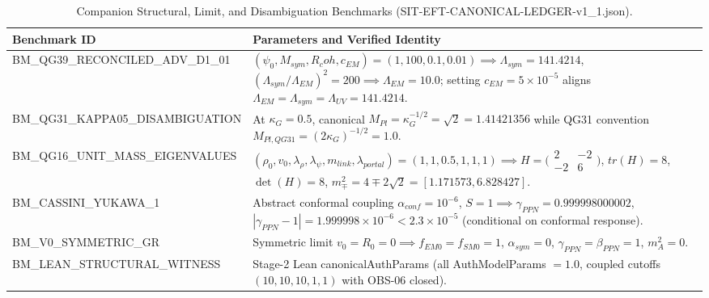 \documentclass[american,11pt,letterpaper]{article}
\newcommand{\Rcoh}{R_{\mathrm{coh}}}
\def\mathrm#1{#1}%
\def\texttt#1{#1}%
\def\Rcoh{R_coh}%
\begin{document}
\begin{table}[htbp]
\centering
\caption{Companion Structural, Limit, and Disambiguation Benchmarks (\texttt{SIT-EFT-CANONICAL-LEDGER-v1\_\allowbreak{}1.\allowbreak{}json}).}
\label{tab:six-companion-benchmarks}
\vspace{0.4em}
\small
\begin{tabular}{|p{4.6cm}|p{9.8cm}|}
\hline
\textbf{Benchmark ID} & \textbf{Parameters and Verified Identity} \\
\hline
\texttt{BM\_\allowbreak{}QG39\_\allowbreak{}RECONCILED\_\allowbreak{}ADV\_\allowbreak{}D1\_\allowbreak{}01} & $(\psi_0, M_{\mathrm{sym}}, \Rcoh, c_{\mathrm{EM}}) = (1, 100, 0.1, 0.01) \implies \Lambda_{\mathrm{sym}} = 141.4214$, $(\Lambda_{\mathrm{sym}}/\Lambda_{\mathrm{EM}})^2 = 200 \implies \Lambda_{\mathrm{EM}} = 10.0$; setting $c_{\mathrm{EM}} = 5\times 10^{-5}$ aligns $\Lambda_{\mathrm{EM}} = \Lambda_{\mathrm{sym}} = \Lambda_{\mathrm{UV}} = 141.4214$. \\
\hline
\texttt{BM\_\allowbreak{}QG31\_\allowbreak{}KAPPA05\_\allowbreak{}DISAMBIGUATION} & At $\kappa_G = 0.5$, canonical $M_{\mathrm{Pl}} = \kappa_G^{-1/2} = \sqrt{2} = 1.41421356$ while \texttt{QG31} convention $M_{\mathrm{Pl,QG31}} = (2\kappa_G)^{-1/2} = 1.0$. \\
\hline
\texttt{BM\_\allowbreak{}QG16\_\allowbreak{}UNIT\_\allowbreak{}MASS\_\allowbreak{}EIGENVALUES} & $(\rho_0,v_0,\lambda_\rho,\lambda_\psi,m_{\mathrm{link}},\lambda_{\mathrm{portal}}) = (1,1,0.5,1,1,1) \implies H = \bigl(\begin{smallmatrix}2 & -2\\ -2 & 6\end{smallmatrix}\bigr)$, $\mathrm{tr}(H)=8$, $\det(H)=8$, $m_\mp^2 = 4 \mp 2\sqrt{2} = [1.171573, 6.828427]$. \\
\hline
\texttt{BM\_\allowbreak{}CASSINI\_\allowbreak{}YUKAWA\_\allowbreak{}1} & Abstract conformal coupling $\alpha_{\mathrm{conf}} = 10^{-6}$, $S = 1 \implies \gamma_{\mathrm{PPN}} = 0.999998000002$, $|\gamma_{\mathrm{PPN}}-1| = 1.999998\times 10^{-6} < 2.3\times 10^{-5}$ (conditional on conformal response). \\
\hline
\texttt{BM\_V0\_SYMMETRIC\_GR} & Symmetric limit $v_0 = R_0 = 0 \implies f_{\mathrm{EM}0} = f_{\mathrm{SM}0} = 1$, $\alpha_{\mathrm{sym}} = 0$, $\gamma_{\mathrm{PPN}} = \beta_{\mathrm{PPN}} = 1$, $m_A^2 = 0$. \\
\hline
\texttt{BM\_\allowbreak{}LEAN\_\allowbreak{}STRUCTURAL\_\allowbreak{}WITNESS} & Stage-2 Lean \texttt{canonicalAuthParams} (all \texttt{AuthModelParams} $= 1.0$, coupled cutoffs $(10,10,10,1,1)$ with \texttt{OBS-06} closed). \\
\hline
\end{tabular}
\end{table}
\end{document}
